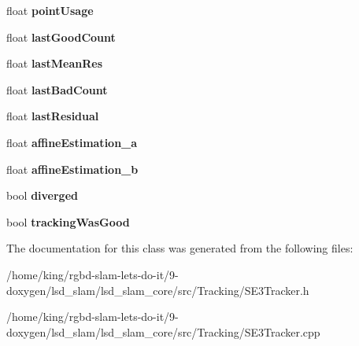 \begin{DoxyCompactItemize}
\item 
\hypertarget{classlsd__slam_1_1_s_e3_tracker_abafd83f1a3ebd3cde778214f8eefa88a}{float {\bfseries point\-Usage}}\label{classlsd__slam_1_1_s_e3_tracker_abafd83f1a3ebd3cde778214f8eefa88a}

\item 
\hypertarget{classlsd__slam_1_1_s_e3_tracker_aa5c3cad4c11940fc4f133bf9e20eae88}{float {\bfseries last\-Good\-Count}}\label{classlsd__slam_1_1_s_e3_tracker_aa5c3cad4c11940fc4f133bf9e20eae88}

\item 
\hypertarget{classlsd__slam_1_1_s_e3_tracker_ab5a14f1b49095ebed44766f1e3528c61}{float {\bfseries last\-Mean\-Res}}\label{classlsd__slam_1_1_s_e3_tracker_ab5a14f1b49095ebed44766f1e3528c61}

\item 
\hypertarget{classlsd__slam_1_1_s_e3_tracker_a95114010e6904ac3f266337a29c1a677}{float {\bfseries last\-Bad\-Count}}\label{classlsd__slam_1_1_s_e3_tracker_a95114010e6904ac3f266337a29c1a677}

\item 
\hypertarget{classlsd__slam_1_1_s_e3_tracker_a148057b7b4dfc84dfa504efea88e8ab8}{float {\bfseries last\-Residual}}\label{classlsd__slam_1_1_s_e3_tracker_a148057b7b4dfc84dfa504efea88e8ab8}

\item 
\hypertarget{classlsd__slam_1_1_s_e3_tracker_a1d10c055524af7dac1f27b5e9946b92d}{float {\bfseries affine\-Estimation\-\_\-a}}\label{classlsd__slam_1_1_s_e3_tracker_a1d10c055524af7dac1f27b5e9946b92d}

\item 
\hypertarget{classlsd__slam_1_1_s_e3_tracker_afbb4c99a14daf56a6c92c9d61064631e}{float {\bfseries affine\-Estimation\-\_\-b}}\label{classlsd__slam_1_1_s_e3_tracker_afbb4c99a14daf56a6c92c9d61064631e}

\item 
\hypertarget{classlsd__slam_1_1_s_e3_tracker_a3da2769c104862efa882b0b04026dbc9}{bool {\bfseries diverged}}\label{classlsd__slam_1_1_s_e3_tracker_a3da2769c104862efa882b0b04026dbc9}

\item 
\hypertarget{classlsd__slam_1_1_s_e3_tracker_a6bb2c2fd5415b9487c5ece3d34abd7c8}{bool {\bfseries tracking\-Was\-Good}}\label{classlsd__slam_1_1_s_e3_tracker_a6bb2c2fd5415b9487c5ece3d34abd7c8}

\end{DoxyCompactItemize}


The documentation for this class was generated from the following files\-:\begin{DoxyCompactItemize}
\item 
/home/king/rgbd-\/slam-\/lets-\/do-\/it/9-\/doxygen/lsd\-\_\-slam/lsd\-\_\-slam\-\_\-core/src/\-Tracking/S\-E3\-Tracker.\-h\item 
/home/king/rgbd-\/slam-\/lets-\/do-\/it/9-\/doxygen/lsd\-\_\-slam/lsd\-\_\-slam\-\_\-core/src/\-Tracking/S\-E3\-Tracker.\-cpp\end{DoxyCompactItemize}
